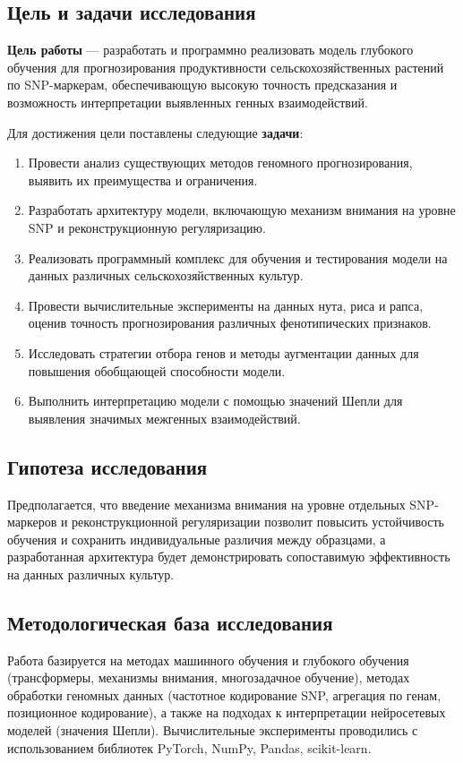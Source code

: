 \subsection*{Цель и задачи исследования}
\textbf{Цель работы} — разработать и программно реализовать модель 
глубокого обучения для прогнозирования продуктивности сельскохозяйственных 
растений по SNP-маркерам, обеспечивающую высокую точность предсказания 
и возможность интерпретации выявленных генных взаимодействий.

Для достижения цели поставлены следующие \textbf{задачи}:
\begin{enumerate}
	\item Провести анализ существующих методов геномного прогнозирования, 
	выявить их преимущества и ограничения.
	\item Разработать архитектуру модели, включающую механизм внимания 
	на уровне SNP и реконструкционную регуляризацию.
	\item Реализовать программный комплекс для обучения и тестирования 
	модели на данных различных сельскохозяйственных культур.
	\item Провести вычислительные эксперименты на данных нута, риса и 
	рапса, оценив точность прогнозирования различных фенотипических 
	признаков.
	\item Исследовать стратегии отбора генов и методы аугментации данных 
	для повышения обобщающей способности модели.
	\item Выполнить интерпретацию модели с помощью значений Шепли для 
	выявления значимых межгенных взаимодействий.
\end{enumerate}

\subsection*{Гипотеза исследования}
Предполагается, что введение механизма внимания на уровне отдельных 
SNP-маркеров и реконструкционной регуляризации позволит повысить 
устойчивость обучения и сохранить индивидуальные различия между 
образцами, а разработанная архитектура будет демонстрировать 
сопоставимую эффективность на данных различных культур.

\subsection*{Методологическая база исследования}
Работа базируется на методах машинного обучения и глубокого обучения 
(трансформеры, механизмы внимания, многозадачное обучение), методах 
обработки геномных данных (частотное кодирование SNP, агрегация по 
генам, позиционное кодирование), а также на подходах к интерпретации 
нейросетевых моделей (значения Шепли). Вычислительные эксперименты 
проводились с использованием библиотек PyTorch, NumPy, Pandas, scikit-learn.

